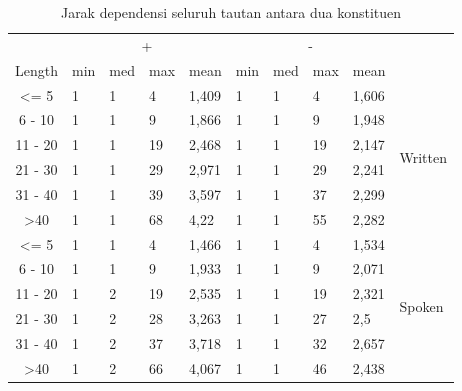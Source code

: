 \documentclass[10pt, a4paper, conference, compsocconf]{IEEEtran}
\begin{document}
\begin{table}
\begin{center}
\tiny
\caption{Jarak dependensi seluruh tautan antara dua konstituen}  \label{tab:deskriptif-konstituen}
\begin{tabular}{c l l l l l l l l l}
\hline
 & \multicolumn{4}{c}{+} & \multicolumn{4}{c}{-} & \\  \cline{2-9}  
Length & min & med	& max & mean & min & med & max & mean & \\ \cline{1-10}  
\textless= 5 	& 1 & 1 & 4 & 1,409 	& 1 & 1 & 4 & 1,606 & \multirow{6}{*}{Written}\\
6 - 10 		& 1 & 1 & 9 & 1,866 	& 1 & 1 & 9 & 1,948 & \\
11 - 20 		& 1 & 1 & 19 & 2,468 & 1 & 1 & 19 & 2,147 & \\
21 - 30 		& 1 & 1 & 29 & 2,971 & 1 & 1 & 29 & 2,241 & \\ 
31 - 40 		& 1 & 1 & 39 & 3,597 & 1 & 1 & 37 & 2,299 & \\
\textgreater 40 & 1 & 1 & 68 & 4,22 	& 1 & 1 & 55 & 2,282 & \\ 
\hline
\textless= 5 	& 1 & 1 & 4 & 1,466 	& 1 & 1 & 4 & 1,534 & \multirow{6}{*}{Spoken}\\
6 - 10 		& 1 & 1 & 9 & 1,933 	& 1 & 1 & 9 & 2,071 & \\
11 - 20 		& 1 & 2 & 19 & 2,535 & 1 & 1 & 19 & 2,321 & \\
21 - 30 		& 1 & 2 & 28 & 3,263 & 1 & 1 & 27 & 2,5 & \\ 
31 - 40 		& 1 & 2 & 37 & 3,718 & 1 & 1 & 32 & 2,657 & \\
\textgreater 40 & 1 & 2 & 66 & 4,067 	& 1 & 1 & 46 & 2,438 & \\ 
\hline
   \end{tabular}
\end{center}
\end{table}
\end{document}
